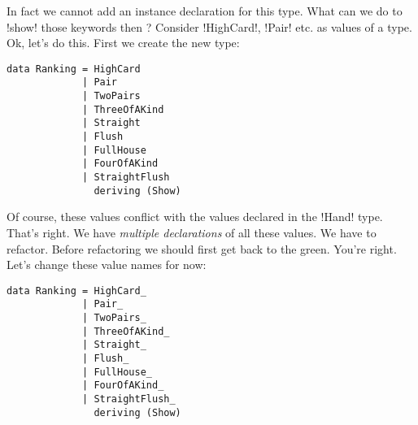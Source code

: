 \documentclass[a4paper,10pt]{article}
\begin{document}
In fact we cannot add an instance declaration for this type. 
\lhN What can we do to \il!show! those keywords then ?
\lhA Consider \il!HighCard!, \il!Pair! etc. as values of a type.
\lhN Ok, let's do this.
\lhA First we create the new type:
\begin{lstlisting}[frame=single]
data Ranking = HighCard 
             | Pair
             | TwoPairs
             | ThreeOfAKind
             | Straight
             | Flush
             | FullHouse
             | FourOfAKind
             | StraightFlush
               deriving (Show)
\end{lstlisting}
\error Of course, these values conflict with the values declared in the \il!Hand! type.
\lhN That's right. We have \emph{multiple declarations} of all these values. We have to refactor.
\lhA Before refactoring we should first get back to the green.
\lhN You're right. Let's change these value names for now:

\begin{lstlisting}[frame=single]
data Ranking = HighCard_ 
             | Pair_
             | TwoPairs_
             | ThreeOfAKind_
             | Straight_
             | Flush_
             | FullHouse_
             | FourOfAKind_
             | StraightFlush_
               deriving (Show)
\end{lstlisting}
\lhend
\end{document}
